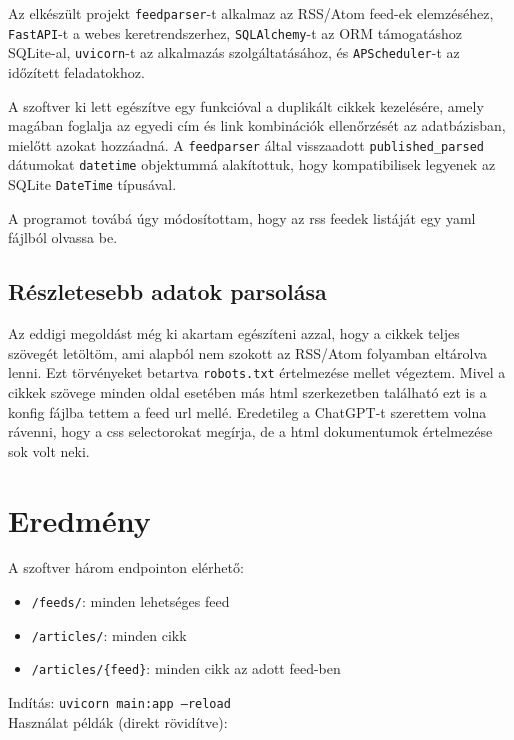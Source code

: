 \documentclass[]{article}
\begin{document}
Az elkészült projekt \texttt{feedparser}-t alkalmaz az RSS/Atom feed-ek elemzéséhez, \texttt{FastAPI}-t a webes keretrendszerhez, \texttt{SQLAlchemy}-t az ORM támogatáshoz SQLite-al, \texttt{uvicorn}-t az alkalmazás szolgáltatásához, és \texttt{APScheduler}-t az időzített feladatokhoz.

A szoftver ki lett egészítve egy funkcióval a duplikált cikkek kezelésére, amely magában foglalja az egyedi cím és link kombinációk ellenőrzését az adatbázisban, mielőtt azokat hozzáadná. A \texttt{feedparser} által visszaadott \texttt{published\_parsed} dátumokat \texttt{datetime} objektummá alakítottuk, hogy kompatibilisek legyenek az SQLite \texttt{DateTime} típusával.

A programot továbá úgy módosítottam, hogy az rss feedek listáját egy yaml fájlból olvassa be.

\subsection{Részletesebb adatok parsolása}

Az eddigi megoldást még ki akartam egészíteni azzal, hogy a cikkek teljes szövegét letöltöm, ami alapból nem szokott az RSS/Atom folyamban eltárolva lenni. Ezt törvényeket betartva \texttt{robots.txt} értelmezése mellet végeztem. Mivel a cikkek szövege minden oldal esetében más html szerkezetben található ezt is a konfig fájlba tettem a feed url mellé. Eredetileg a ChatGPT-t szerettem volna rávenni, hogy a css selectorokat megírja, de a html dokumentumok értelmezése sok volt neki.

\section{Eredmény}

A szoftver három endpointon elérhető:
\begin{itemize}
	\item \texttt{/feeds/}: minden lehetséges feed
	\item \texttt{/articles/}: minden cikk
	\item \texttt{/articles/\{feed\}}: minden cikk az adott feed-ben
\end{itemize}

Indítás: \texttt{uvicorn main:app --reload}\\

Használat példák (direkt rövidítve):\\
\end{document}
